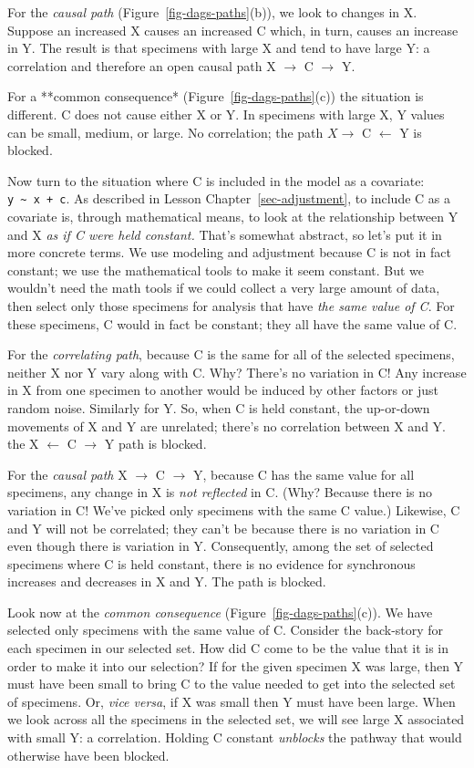\documentclass[
  letterpaper,
  DIV=11,
  numbers=noendperiod,
  oneside]{scrartcl}
\begin{document}
\begin{tcolorbox}
For the \emph{causal path} (Figure~\ref{fig-dags-paths}(b)), we look to
changes in X. Suppose an increased X causes an increased C which, in
turn, causes an increase in Y. The result is that specimens with large X
and tend to have large Y: a correlation and therefore an open causal
path X \(\rightarrow\) C \(\rightarrow\) Y.

For a **common consequence* (Figure~\ref{fig-dags-paths}(c)) the
situation is different. C does not cause either X or Y. In specimens
with large X, Y values can be small, medium, or large. No correlation;
the path \(X \rightarrow\) C \(\leftarrow\) Y is blocked.

Now turn to the situation where C is included in the model as a
covariate: \texttt{y\ \textasciitilde{}\ x\ +\ c}. As described in
Lesson Chapter~\ref{sec-adjustment}, to include C as a covariate is,
through mathematical means, to look at the relationship between Y and X
\emph{as if C were held constant.} That's somewhat abstract, so let's
put it in more concrete terms. We use modeling and adjustment because C
is not in fact constant; we use the mathematical tools to make it seem
constant. But we wouldn't need the math tools if we could collect a very
large amount of data, then select only those specimens for analysis that
have \emph{the same value of C}. For these specimens, C would in fact be
constant; they all have the same value of C.

For the \emph{correlating path}, because C is the same for all of the
selected specimens, neither X nor Y vary along with C. Why? There's no
variation in C! Any increase in X from one specimen to another would be
induced by other factors or just random noise. Similarly for Y. So, when
C is held constant, the up-or-down movements of X and Y are unrelated;
there's no correlation between X and Y. the X \(\leftarrow\) C
\(\rightarrow\) Y path is blocked.

For the \emph{causal path} X \(\rightarrow\) C \(\rightarrow\) Y,
because C has the same value for all specimens, any change in X is
\emph{not reflected} in C. (Why? Because there is no variation in C!
We've picked only specimens with the same C value.) Likewise, C and Y
will not be correlated; they can't be because there is no variation in C
even though there is variation in Y. Consequently, among the set of
selected specimens where C is held constant, there is no evidence for
synchronous increases and decreases in X and Y. The path is blocked.

Look now at the \emph{common consequence}
(Figure~\ref{fig-dags-paths}(c)). We have selected only specimens with
the same value of C. Consider the back-story for each specimen in our
selected set. How did C come to be the value that it is in order to make
it into our selection? If for the given specimen X was large, then Y
must have been small to bring C to the value needed to get into the
selected set of specimens. Or, \emph{vice versa}, if X was small then Y
must have been large. When we look across all the specimens in the
selected set, we will see large X associated with small Y: a
correlation. Holding C constant \emph{unblocks} the pathway that would
otherwise have been blocked.

\end{tcolorbox}
\end{document}
